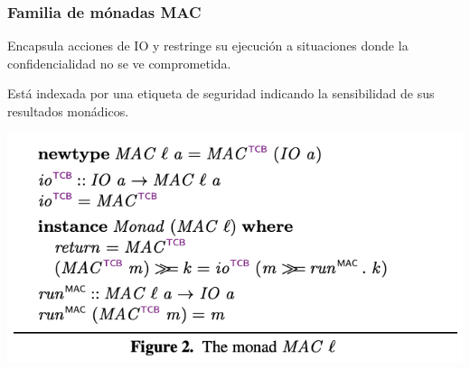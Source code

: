 \documentclass{beamer}
\begin{document}
\begin{frame}
    \frametitle{Familia de mónadas MAC}
    Encapsula acciones de IO y restringe su ejecución a situaciones donde la confidencialidad no se ve comprometida.\newline

    Está indexada por una etiqueta de seguridad indicando la sensibilidad de sus resultados monádicos.

    \begin{center}
        \includegraphics[scale=0.7]{figure2.png}
    \end{center}
\end{frame}
\end{document}

